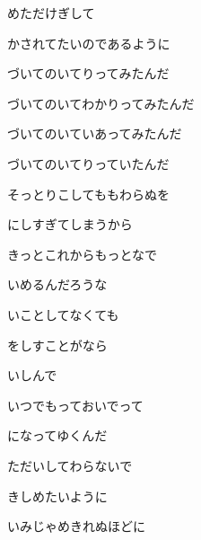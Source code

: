\documentclass[a4paper,tate,twocolumn,12pt]{ltjtarticle}
\begin{document}
\begin{flushleft}
\begin{minipage}{\linewidth}
めただけぎして

かされてたいのであるように
\end{minipage}

\vspace{2em}

\noindent\begin{minipage}{\linewidth}
づいてのいてりってみたんだ

づいてのいてわかりってみたんだ

づいてのいていあってみたんだ

づいてのいてりっていたんだ
\end{minipage}

\vspace{2em}

\noindent\begin{minipage}{\linewidth}
そっとりこしてももわらぬを

にしすぎてしまうから

きっとこれからもっとなで

いめるんだろうな

いことしてなくても

をしすことがなら

いしんで

いつでもっておいでって

になってゆくんだ
\end{minipage}

\vspace{2em}

\noindent\begin{minipage}{\linewidth}
ただいしてわらないで

きしめたいように

いみじゃめきれぬほどに


\end{minipage}
\end{flushleft}
\end{document}
